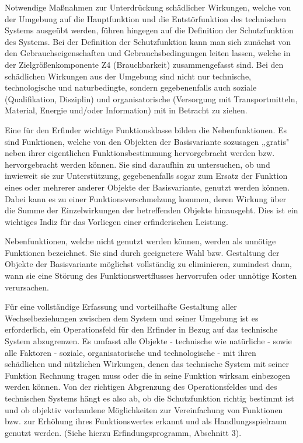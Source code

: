 \documentclass[12pt,a4paper]{article}
\begin{document}
Notwendige Maßnahmen zur Unterdrückung schädlicher Wirkungen, wel­che von der Umgebung auf die Hauptfunktion und die Entstörfunktion des technischen Systems ausgeübt werden, führen hingegen auf die Definition der Schutzfunktion des Systems. Bei der Definition der Schutzfunktion kann man sich zunächst von den Gebrauchseigenschaften und Gebrauchsbedingungen leiten lassen, welche in der Zielgrößenkomponente Z4 (Brauchbarkeit) zusammengefasst sind. Bei den schädlichen Wirkungen aus der Umgebung sind nicht nur technische, technologische und naturbedingte, sondern gegebenenfalls auch soziale (Qualifikation, Disziplin) und organisatorische (Versorgung mit Transportmitteln, Material, Energie und/oder Information) mit in Betracht zu ziehen.

Eine für den Erfinder wichtige Funktionsklasse bilden die Nebenfunktionen. Es sind Funktionen, welche von den Objekten der Basisvariante sozusagen „gratis" neben ihrer eigentlichen Funktionsbestimmung hervorgebracht werden bzw. hervorgebracht werden können. Sie sind daraufhin zu untersuchen, ob und inwieweit sie zur Unterstützung, gegebenenfalls sogar zum Ersatz der Funktion eines oder mehrerer anderer Objekte der Basisvariante, genutzt werden können. Dabei kann es zu einer Funktionsverschmelzung kommen, deren Wirkung über die Summe der Einzelwirkungen der betreffenden Objekte hinausgeht. Dies ist ein wichtiges Indiz für das Vorliegen einer erfinderischen Leistung.

Nebenfunktionen, welche nicht genutzt werden können, werden als unnötige Funktionen bezeichnet. Sie sind durch geeignetere Wahl bzw. Gestaltung der Objekte der Basisvariante möglichst vollständig zu eliminieren, zumindest dann, wann sie eine Störung des Funktionswertflusses hervorrufen oder unnötige Kosten verursachen.

Für eine vollständige Erfassung und vorteilhafte Gestaltung aller Wechselbeziehungen zwischen dem System und seiner Umgebung ist es erforderlich, ein Operationsfeld für den Erfinder in Bezug auf das technische System abzugrenzen. Es umfasst alle Objekte - technische wie natürliche - sowie alle Faktoren - soziale, organisatorische und technologische - mit ihren schädlichen und nützlichen Wirkungen, denen das technische System mit seiner Funktion Rechnung tragen muss oder die in seine Funktion wirksam einbezogen werden können. Von der richtigen Abgrenzung des Operationsfeldes und des technischen Systems hängt es also ab, ob die Schutzfunktion richtig bestimmt ist und ob objektiv vorhandene Möglichkeiten zur Vereinfachung von Funktionen bzw. zur Erhöhung ihres Funktionswertes erkannt und als Handlungsspielraum genutzt werden. (Siehe hierzu Erfindungsprogramm, Abschnitt 3).
\end{document}
